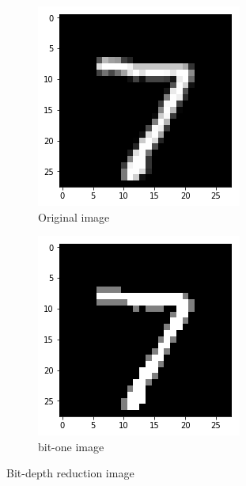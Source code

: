 \begin{figure}[h!]
	\centering
	\begin{subfigure}{.35\textwidth}
		\includegraphics[width=\textwidth]{original7.png}
		\caption{Original image}
		\label{fig: bit-depth reduction 1}
	\end{subfigure}
	\begin{subfigure}{.35\textwidth}
		\includegraphics[width=\textwidth]{bit1-7.png}
		\caption{bit-one image}
		\label{fig: bit-depth reduction 8}
	\end{subfigure}
	\caption{Bit-depth reduction image}
\end{figure}

